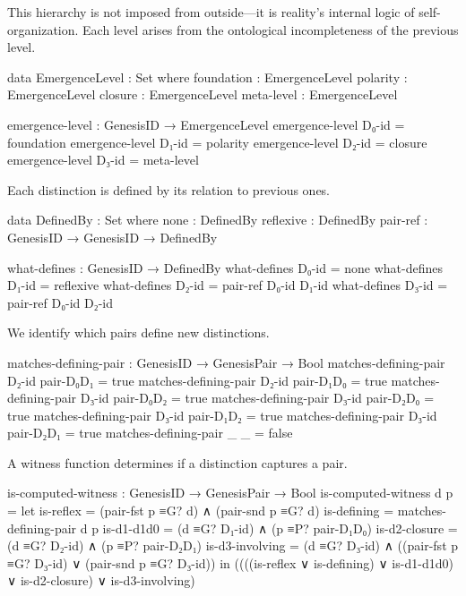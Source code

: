 \documentclass[11pt,a4paper]{book}
\begin{document}
This hierarchy is not imposed from outside—it is reality's internal logic of self-organization.
Each level arises from the ontological incompleteness of the previous level.

\begin{code}
data EmergenceLevel : Set where
  foundation : EmergenceLevel
  polarity   : EmergenceLevel
  closure    : EmergenceLevel
  meta-level : EmergenceLevel

emergence-level : GenesisID → EmergenceLevel
emergence-level D₀-id = foundation
emergence-level D₁-id = polarity
emergence-level D₂-id = closure
emergence-level D₃-id = meta-level
\end{code}

Each distinction is defined by its relation to previous ones.

\begin{code}
data DefinedBy : Set where
  none       : DefinedBy
  reflexive  : DefinedBy
  pair-ref   : GenesisID → GenesisID → DefinedBy

what-defines : GenesisID → DefinedBy
what-defines D₀-id = none
what-defines D₁-id = reflexive
what-defines D₂-id = pair-ref D₀-id D₁-id
what-defines D₃-id = pair-ref D₀-id D₂-id
\end{code}

We identify which pairs define new distinctions.

\begin{code}
matches-defining-pair : GenesisID → GenesisPair → Bool
matches-defining-pair D₂-id pair-D₀D₁ = true
matches-defining-pair D₂-id pair-D₁D₀ = true
matches-defining-pair D₃-id pair-D₀D₂ = true
matches-defining-pair D₃-id pair-D₂D₀ = true
matches-defining-pair D₃-id pair-D₁D₂ = true
matches-defining-pair D₃-id pair-D₂D₁ = true
matches-defining-pair _     _         = false
\end{code}

A witness function determines if a distinction captures a pair.

\begin{code}
is-computed-witness : GenesisID → GenesisPair → Bool
is-computed-witness d p = 
  let is-reflex = (pair-fst p ≡G? d) ∧ (pair-snd p ≡G? d)
      is-defining = matches-defining-pair d p
      is-d1-d1d0 = (d ≡G? D₁-id) ∧ (p ≡P? pair-D₁D₀)
      is-d2-closure = (d ≡G? D₂-id) ∧ (p ≡P? pair-D₂D₁)
      is-d3-involving = (d ≡G? D₃-id) ∧ ((pair-fst p ≡G? D₃-id) ∨ (pair-snd p ≡G? D₃-id))
  in ((((is-reflex ∨ is-defining) ∨ is-d1-d1d0) ∨ is-d2-closure) ∨ is-d3-involving)
\end{code}
\end{document}
